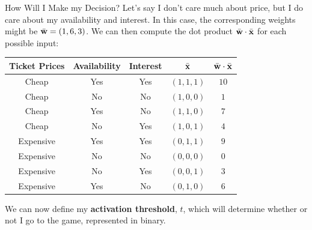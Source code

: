 \documentclass[xcolor=dvipsnames, fontsize=11pt, %
pagesize, %
parskip=half-, t]{beamer}
\begin{document}
\begin{frame}{How Will I Make my Decision?}
Let's say I don't care much about price, but I do care about my availability and interest. In this case, the corresponding weights might be $\bar{\bold{w}}=(1, 6, 3)$. \pause We can then compute the dot product $\bar{\bold{w}}\cdot \bar{\bold{x}}$ for each possible input:  
\begin{table} 
\center 
\begin{tabular}{cccc|c}
Ticket Prices & Availability & Interest & $\bar{\bold{x}}$ & $\bar{\bold{w}}\cdot \bar{\bold{x}}$ \\ \hline 
Cheap & Yes & Yes & $(1,1,1)$ & $10$ \\
Cheap & No & No & $(1,0,0)$ & $1$ \\
Cheap & Yes & No & $(1,1,0)$ & $7$\\
Cheap & No & Yes & $(1,0,1)$ & $4$   \\
Expensive & Yes & Yes & $(0,1,1)$ & $9$ \\
Expensive & No & No & $(0,0,0)$  & $0$ \\
Expensive & No & Yes & $(0,0,1)$ & $3$\\
Expensive & Yes & No & $(0,1,0)$ & $6$
\end{tabular}
\end{table} \pause
\vspace{0.05\textheight}
We can now define my \textbf{activation threshold}, $t$, which will determine whether or not I go to the game, represented in binary.
\end{frame}
\end{document}

